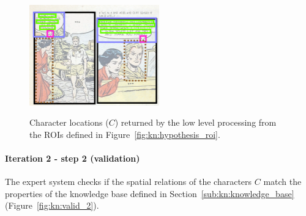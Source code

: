  \begin{figure}[!ht]  %
   \centering
   \includegraphics[trim= 0px 0px 0px 0px, clip, width=0.5\textwidth]{process_illustration_hypo_2_2.png}\\
  \caption[Character locations ($C$) returned by the low level processing]{Character locations ($C$) returned by the low level processing from the ROIs defined in Figure~\ref{fig:kn:hypothesis_roi}.
  }%
  \label{fig:kn:graph_character_region}
 \end{figure}

\paragraph{Iteration 2 - step 2 (validation)} %
\label{par:step_5}
The expert system checks if the spatial relations of the characters $C$ match the properties of the knowledge base defined in Section~\ref{sub:kn:knowledge_base} (Figure~\ref{fig:kn:valid_2}).


